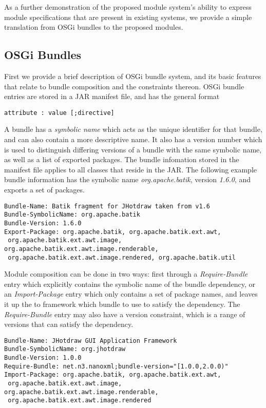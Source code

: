 As a further demonstration of the proposed module system's ability to 
express module specifications that are present in existing systems, 
we provide a simple translation from OSGi bundles to the proposed modules.

\subsection{OSGi Bundles}

First we provide a brief description of OSGi bundle system, and its basic
features that relate to bundle composition and the constraints thereon.
OSGi bundle entries are stored in a JAR manifest file, and has the
general format

\begin{lstlisting}
attribute : value [;directive]
\end{lstlisting}

A bundle has a \textit{symbolic name} which acts as the unique identifier for that bundle, 
and can also contain a more descriptive name.
It also has a version number which is used to distinguish differing versions of
a bundle with the same symbolic name, as well as a list of exported packages.
 The bundle infomation stored in the
manifest file applies to all classes that reside in the JAR. The following example
bundle information has the symbolic name \textit{org.apache.batik}, version \textit{1.6.0},
and exports a set of packages.

\begin{lstlisting}[caption=Basic OSGi bundle]
Bundle-Name: Batik fragment for JHotdraw taken from v1.6
Bundle-SymbolicName: org.apache.batik
Bundle-Version: 1.6.0
Export-Package: org.apache.batik, org.apache.batik.ext.awt,
 org.apache.batik.ext.awt.image, org.apache.batik.ext.awt.image.renderable,
 org.apache.batik.ext.awt.image.rendered, org.apache.batik.util
\end{lstlisting}

Module composition can be done in two ways: first through a \textit{Require-Bundle}
entry which explicitly contains the symbolic name of the bundle dependency, or an
\textit{Import-Package} entry which only contains a set of package names, and leaves
it up the to framework which bundle to use to satisfy the dependency. The \textit{Require-Bundle}
entry may also have a version constraint, which is a range of versions that can satisfy
the dependency.

\begin{lstlisting}[caption=Require-bundle and Import-package]
Bundle-Name: JHotdraw GUI Application Framework
Bundle-SymbolicName: org.jhotdraw
Bundle-Version: 1.0.0
Require-Bundle: net.n3.nanoxml;bundle-version="[1.0.0,2.0.0)"
Import-Package: org.apache.batik, org.apache.batik.ext.awt,
 org.apache.batik.ext.awt.image, org.apache.batik.ext.awt.image.renderable,
 org.apache.batik.ext.awt.image.rendered
\end{lstlisting}

